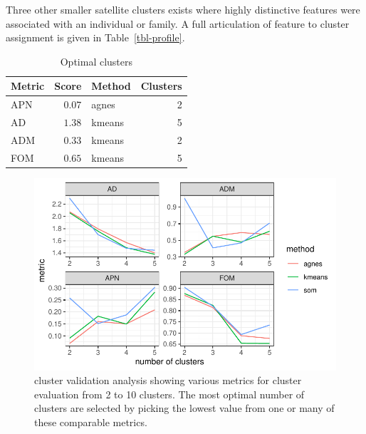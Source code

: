 \documentclass[
  authoryear,
  preprint,
  3p]{elsarticle}
\begin{document}
Three other smaller satellite clusters exists where highly distinctive
features were associated with an individual or family. A full
articulation of feature to cluster assignment is given in
Table~\ref{tbl-profile}.

\hypertarget{tbl-opticlust}{}
\begin{longtable}{lrlr}
\caption{\label{tbl-opticlust}Optimal clusters }\tabularnewline

\toprule
Metric & Score & Method & Clusters \\ 
\midrule
APN & $0.07$ & agnes & 2 \\ 
AD & $1.38$ & kmeans & 5 \\ 
ADM & $0.33$ & kmeans & 2 \\ 
FOM & $0.65$ & kmeans & 5 \\ 
\bottomrule
\end{longtable}

\begin{figure}

{\centering \includegraphics{paper_files/figure-pdf/fig-clvalid-1.pdf}

}

\caption{\label{fig-clvalid}cluster validation analysis showing various
metrics for cluster evaluation from 2 to 10 clusters. The most optimal
number of clusters are selected by picking the lowest value from one or
many of these comparable metrics.}

\end{figure}
\end{document}
